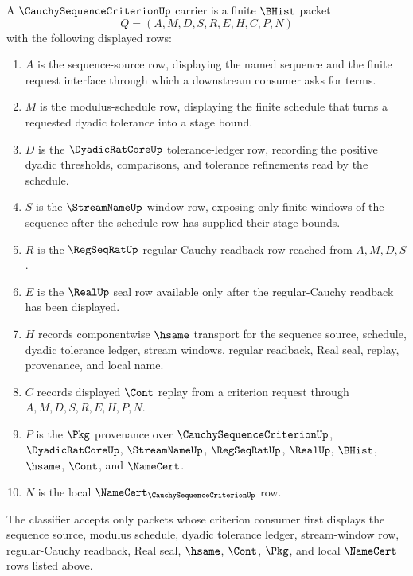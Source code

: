 \begin{definition}
\label{def:cauchy-sequence-criterion-carrier}
A $\CauchySequenceCriterionUp$ carrier is a finite $\BHist$ packet
$$
Q=(A,M,D,S,R,E,H,C,P,N)
$$
with the following displayed rows:
\begin{enumerate}
\item $A$ is the sequence-source row, displaying the named sequence and the finite request interface through which a downstream consumer asks for terms.
\item $M$ is the modulus-schedule row, displaying the finite schedule that turns a requested dyadic tolerance into a stage bound.
\item $D$ is the $\DyadicRatCoreUp$ tolerance-ledger row, recording the positive dyadic thresholds, comparisons, and tolerance refinements read by the schedule.
\item $S$ is the $\StreamNameUp$ window row, exposing only finite windows of the sequence after the schedule row has supplied their stage bounds.
\item $R$ is the $\RegSeqRatUp$ regular-Cauchy readback row reached from $A,M,D,S$.
\item $E$ is the $\RealUp$ seal row available only after the regular-Cauchy readback has been displayed.
\item $H$ records componentwise $\hsame$ transport for the sequence source, schedule, dyadic tolerance ledger, stream windows, regular readback, Real seal, replay, provenance, and local name.
\item $C$ records displayed $\Cont$ replay from a criterion request through $A,M,D,S,R,E,H,P,N$.
\item $P$ is the $\Pkg$ provenance over $\CauchySequenceCriterionUp$, $\DyadicRatCoreUp$, $\StreamNameUp$, $\RegSeqRatUp$, $\RealUp$, $\BHist$, $\hsame$, $\Cont$, and $\NameCert$.
\item $N$ is the local $\NameCert_{\CauchySequenceCriterionUp}$ row.
\end{enumerate}
The classifier accepts only packets whose criterion consumer first displays the sequence source, modulus schedule, dyadic tolerance ledger, stream-window row, regular-Cauchy readback, Real seal, $\hsame$, $\Cont$, $\Pkg$, and local $\NameCert$ rows listed above.
\end{definition}


